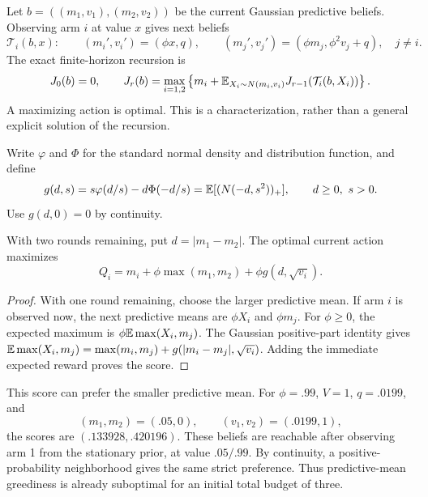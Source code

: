 Let $b=((m_1,v_1),(m_2,v_2))$ be the current Gaussian predictive beliefs. Observing arm $i$ at value $x$ gives next beliefs
\begin{equation}
\mathcal T_i(b,x):\qquad
(m_i',v_i')=(\phi x,q),\qquad
(m_j',v_j')=(\phi m_j,\phi^2v_j+q),\quad j\ne i.
\end{equation}
The exact finite-horizon recursion is
\begin{equation}
J_0(b)=0,\qquad
J_r(b)=\max_{i=1,2}\left\{m_i+
\mathbb E_{X_i\sim N(m_i,v_i)}J_{r-1}(\mathcal T_i(b,X_i))\right\}.
\label{two_arm_ar1:eq:bellman}
\end{equation}
A maximizing action is optimal. This is a characterization, rather than a general explicit solution of the recursion.

Write $\varphi$ and $\Phi$ for the standard normal density and distribution function, and define
\begin{equation}
g(d,s)=s\varphi(d/s)-d\Phi(-d/s)
=\mathbb E[(N(-d,s^2))_+],\qquad d\geq0,\ s>0.
\end{equation}
Use $g(d,0)=0$ by continuity.

\begin{proposition}
With two rounds remaining, put $d=|m_1-m_2|$. The optimal current action maximizes
\begin{equation}
Q_i=m_i+\phi\max(m_1,m_2)+\phi g(d,\sqrt{v_i}).
\label{two_arm_ar1:eq:two}
\end{equation}
\end{proposition}
\begin{proof}
With one round remaining, choose the larger predictive mean. If arm $i$ is observed now, the next predictive means are $\phi X_i$ and $\phi m_j$. For $\phi\geq0$, the expected maximum is
$\phi\mathbb E\max(X_i,m_j)$. The Gaussian positive-part identity gives
$\mathbb E\max(X_i,m_j)=\max(m_i,m_j)+g(|m_i-m_j|,\sqrt{v_i})$.
Adding the immediate expected reward proves the score.
\end{proof}

This score can prefer the smaller predictive mean. For $\phi=.99$, $V=1$, $q=.0199$, and
\[
(m_1,m_2)=(.05,0),\qquad (v_1,v_2)=(.0199,1),
\]
the scores are $(.133928,.420196)$. These beliefs are reachable after observing arm 1 from the stationary prior, at value $.05/.99$. By continuity, a positive-probability neighborhood gives the same strict preference. Thus predictive-mean greediness is already suboptimal for an initial total budget of three.

